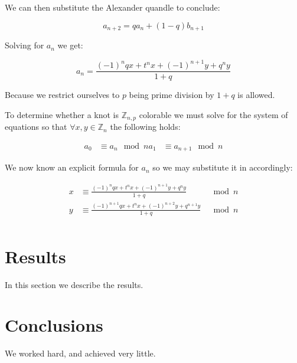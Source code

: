 \documentclass[12pt]{article}
\begin{document}
We can then substitute the Alexander quandle to conclude:

$$ a_{n+2} = qa_{n} + (1-q)b_{n+1} $$

Solving for $a_n$ we get:

$$ a_n = \frac{(-1)^nqx+t^nx+(-1)^{n+1}y+q^ny}{1+q} $$

Because we restrict ourselves to $p$ being prime division by $1+q$ is allowed.

To determine whether a knot is $\mathbb{Z}_{n,p}$ colorable we must solve for the system of equations so that $\forall x,y \in \mathbb{Z}_n$ the following holds:

\begin{align*}
	a_0 &\equiv a_{n}  \mod{n}
	a_1 &\equiv a_{n+1} \mod{n}
\end{align*}

We now know an explicit formula for $a_n$ so we may substitute it in accordingly:

\begin{align*}
	x &\equiv \frac{(-1)^nqx+t^nx+(-1)^{n+1}y+q^ny}{1+q} & \mod{n} \\
	y &\equiv \frac{(-1)^{n+1}qx+t^nx+(-1)^{n+2}y+q^{n+1}y}{1+q} & \mod{n} \\
\end{align*}

\section{Results}\label{results}
In this section we describe the results.

\section{Conclusions}\label{conclusions}
We worked hard, and achieved very little.



\end{document}
